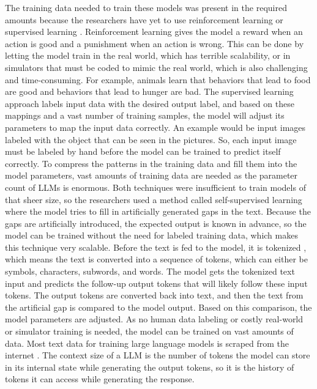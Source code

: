 \documentclass[draft,final]{thesisclass} %
\begin{document}
The training data needed to train these models was present in the required amounts because the researchers have yet to use reinforcement learning \parencite{rl_bible} or supervised learning \parencite[3]{sl_bible}.
Reinforcement learning gives the model a reward when an action is good and a punishment when an action is wrong. This can be done by letting the model train in the real world, which has terrible scalability, or in simulators that must be coded to mimic the real world, which is also challenging and time-consuming.
For example, animals learn that behaviors that lead to food are good and behaviors that lead to hunger are bad.
The supervised learning approach labels input data with the desired output label, and based on these mappings and a vast number of training samples, the model will adjust its parameters to map the input data correctly.
An example would be input images labeled with the object that can be seen in the pictures. So, each input image must be labeled by hand before the model can be trained to predict itself correctly.
To compress the patterns in the training data and fill them into the model parameters, vast amounts of training data are needed as the parameter count of \acs{LLM}s is enormous.
Both techniques were insufficient to train models of that sheer size, so the researchers used a method called self-supervised learning \parencite[7]{llm_literature_review} where the model tries to fill in artificially generated gaps in the text.
Because the gaps are artificially introduced, the expected output is known in advance, so the model can be trained without the need for labeled training data, which makes this technique very scalable.
Before the text is fed to the model, it is tokenized \parencite[4]{llm_literature_review}, which means the text is converted into a sequence of tokens, which can either be symbols, characters, subwords, and words.
The model gets the tokenized text input and predicts the follow-up output tokens that will likely follow these input tokens. The output tokens are converted back into text, and then the text from the artificial gap is compared to the model output.
Based on this comparison, the model parameters are adjusted. As no human data labeling or costly real-world or simulator training is needed, the model can be trained on vast amounts of data.
Most text data for training large language models is scraped from the internet \parencite[1]{llm_literature_review}.
The context size of a \acs{LLM} is the number of tokens the model can store in its internal state while generating the output tokens, so it is the history of tokens it can access while generating the response.
\end{document}
